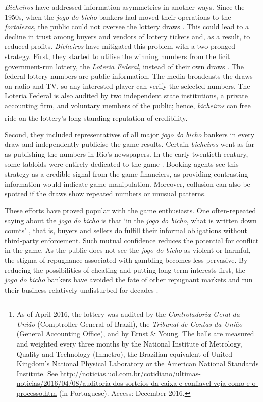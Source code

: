 \documentclass[a4paper,12pt]{article}
\begin{document}
\emph{Bicheiros} have addressed information asymmetries in another ways. Since the 1950s, when the \emph{jogo do bicho} bankers had moved their operations to the \emph{fortalezas}, the public could not oversee the lottery draws \citep[259]{chazkel2011laws}. This could lead to a decline in trust among buyers and vendors of lottery tickets and, as a result, to reduced profits. \emph{Bicheiros} have mitigated this problem with a two-pronged strategy. First, they started to utilise the winning numbers from the licit government-run lottery, the \emph{Loteria Federal}, instead of their own draws \citetext{\citealp[546]{chazkel2007beyond}; \citealp[89]{labronici2012paratodos}; \citealp[39-40]{mello1989historia}}. The federal lottery numbers are public information. The media broadcasts the draws on radio and TV, so any interested player can verify the selected numbers. The Loteria Federal is also audited by two independent state institutions, a private accounting firm, and voluntary members of the public; hence, \emph{bicheiros} can free ride on the lottery's long-standing reputation of credibility.\footnote{As of April 2016, the lottery was audited by the \emph{Controladoria Geral da União} (Comptroller General of Brazil), the \emph{Tribunal de Contas da União} (General Accounting Office), and by Ernst \& Young. The balls are measured and weighted every three months by the National Institute of Metrology, Quality and Technology (Inmetro), the Brazilian equivalent of United Kingdom's National Physical Laboratory or the American National Standards Institute. See \url{http://noticias.uol.com.br/cotidiano/ultimas-noticias/2016/04/08/auditoria-dos-sorteios-da-caixa-e-confiavel-veja-como-e-o-processo.htm} (in Portuguese). Access: December 2016.}

Second, they included representatives of all major \emph{jogo do bicho} bankers in every draw and independently publicise the game results. Certain \emph{bicheiros} went as far as publishing the numbers in Rio's newspapers. In the early twentieth century, some tabloids were entirely dedicated to the game \citep[60]{magalhaes2005ganhou}. Booking agents see this strategy as a credible signal from the game financiers, as providing contrasting information would indicate game manipulation. Moreover, collusion can also be spotted if the draws show repeated numbers or unusual patterns.

These efforts have proved popular with the game enthusiasts. One often-repeated saying about the \emph{jogo do bicho} is that `in the \emph{jogo do bicho}, what is written down counts' \citep[159]{chazkel2011laws}, that is, buyers and sellers do fulfill their informal obligations without third-party enforcement. Such mutual confidence reduces the potential for conflict in the game. As the public does not see the \emph{jogo do bicho} as violent or harmful, the stigma of repugnance associated with gambling becomes less pervasive. By reducing the possibilities of cheating and putting long-term interests first, the \emph{jogo do bicho} bankers have avoided the fate of other repugnant markets and run their business relatively undisturbed for decades \citep[20]{da1999aguias}.
\end{document}
